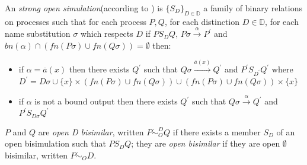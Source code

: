 \begin{definition}
  An \emph{strong open simulation}(according to \cite{parrow}) is $\{S_{D}\}_{D\in \mathbb{D}}$ a family of binary relations on processes such that for each process $P, Q$, for each distinction $D\in \mathbb{D}$, for each name substitution $\sigma$ which respects $D$ if $P S_{D} Q$, $P\sigma \xrightarrow{\alpha} P^{'}$ and $bn(\alpha)\cap (fn(P\sigma)\cup fn(Q\sigma))=\emptyset$ then:
   \begin{itemize}
    \item 
      if $\alpha=\overline{a}(x)$ then there exists $Q^{'}$ such that $Q\sigma \xrightarrow{\overline{a}(x)} Q^{'}$ and $P^{'} S_{D^{'}} Q^{'}$ where $D^{'}=D\sigma \cup \{x\}\times (fn(P\sigma)\cup fn(Q\sigma)) \cup  (fn(P\sigma)\cup fn(Q\sigma))\times\{x\}$
    \item
      if $\alpha$ is not a bound output then there exists $Q^{'}$ such that $Q\sigma \xrightarrow{\alpha} Q^{'}$ and $P^{'} S_{D\sigma} Q^{'}$
  \end{itemize}
  $P$ and $Q$ are \emph{open D bisimilar}, written $P \dot{\sim}_{O}^{D} Q$ if there exists a member $S_{D}$ of an open bisimulation such that $P S_{D} Q$; they are \emph{open bisimilar} if they are open $\emptyset$ bisimilar, written $P \dot{\sim}_{O} D$.
\end{definition}
 
 
















